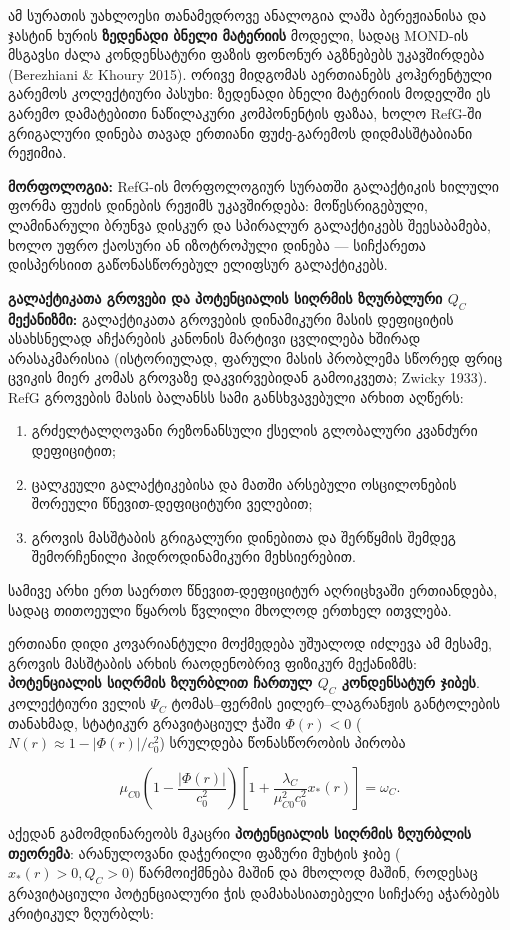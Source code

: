\documentclass[11pt,a4paper]{article}
\begin{document}
ამ სურათის უახლოესი თანამედროვე ანალოგია ლაშა ბერეჟიანისა და ჯასტინ ხურის \textbf{ზედენადი ბნელი მატერიის} მოდელი, სადაც MOND-ის მსგავსი ძალა კონდენსატური ფაზის ფონონურ აგზნებებს უკავშირდება (Berezhiani \& Khoury 2015). ორივე მიდგომას აერთიანებს კოჰერენტული გარემოს კოლექტიური პასუხი: ზედენადი ბნელი მატერიის მოდელში ეს გარემო დამატებითი ნაწილაკური კომპონენტის ფაზაა, ხოლო RefG-ში გრიგალური დინება თავად ერთიანი ფუძე-გარემოს დიდმასშტაბიანი რეჟიმია.

\textbf{მორფოლოგია:} RefG-ის მორფოლოგიურ სურათში გალაქტიკის ხილული ფორმა ფუძის დინების რეჟიმს უკავშირდება: მოწესრიგებული, ლამინარული ბრუნვა დისკურ და სპირალურ გალაქტიკებს შეესაბამება, ხოლო უფრო ქაოსური ან იზოტროპული დინება — სიჩქარეთა დისპერსიით გაწონასწორებულ ელიფსურ გალაქტიკებს.

\textbf{გალაქტიკათა გროვები და პოტენციალის სიღრმის ზღურბლური $Q_C$ მექანიზმი:} გალაქტიკათა გროვების დინამიკური მასის დეფიციტის ასახსნელად აჩქარების კანონის მარტივი ცვლილება ხშირად არასაკმარისია (ისტორიულად, ფარული მასის პრობლემა სწორედ ფრიც ცვიკის მიერ კომას გროვაზე დაკვირვებიდან გამოიკვეთა; Zwicky 1933). RefG გროვების მასის ბალანსს სამი განსხვავებული არხით აღწერს:

\begin{enumerate}[label=\arabic*.]
\item გრძელტალღოვანი რეზონანსული ქსელის გლობალური კვანძური დეფიციტით;
\item ცალკეული გალაქტიკებისა და მათში არსებული ოსცილონების შორეული წნევით-დეფიციტური ველებით;
\item გროვის მასშტაბის გრიგალური დინებითა და შერწყმის შემდეგ შემორჩენილი ჰიდროდინამიკური მეხსიერებით.

\end{enumerate}
სამივე არხი ერთ საერთო წნევით-დეფიციტურ აღრიცხვაში ერთიანდება, სადაც თითოეული წყაროს წვლილი მხოლოდ ერთხელ ითვლება.

ერთიანი დიდი კოვარიანტული მოქმედება უშუალოდ იძლევა ამ მესამე, გროვის მასშტაბის არხის რაოდენობრივ ფიზიკურ მექანიზმს: \textbf{პოტენციალის სიღრმის ზღურბლით ჩართულ $Q_C$ კონდენსატურ ჯიბეს}. კოლექტიური ველის $\Psi_C$ ტომას–ფერმის ეილერ–ლაგრანჟის განტოლების თანახმად, სტატიკურ გრავიტაციულ ჭაში $\Phi(r) < 0$ ($N(r) \approx 1 - |\Phi(r)|/c_0^2$) სრულდება წონასწორობის პირობა

\[
\mu_{C0}\!\left(1 - \frac{|\Phi(r)|}{c_0^2}\right)\!\left[1 + \frac{\lambda_C}{\mu_{C0}^2 c_0^2}x_*(r)\right] = \omega_C.
\]

აქედან გამომდინარეობს მკაცრი \textbf{პოტენციალის სიღრმის ზღურბლის თეორემა}: არანულოვანი დაჭერილი ფაზური მუხტის ჯიბე ($x_*(r) > 0, Q_C > 0$) წარმოიქმნება მაშინ და მხოლოდ მაშინ, როდესაც გრავიტაციული პოტენციალური ჭის დამახასიათებელი სიჩქარე აჭარბებს კრიტიკულ ზღურბლს:
\end{document}
